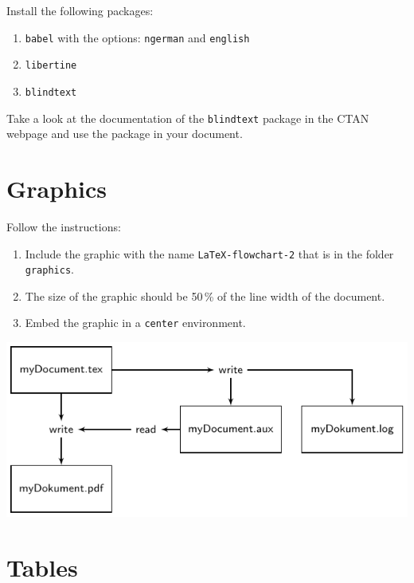 \documentclass[10pt, paper=a4, abstracton]{scrartcl}
\begin{document}
Install the following packages:

\begin{enumerate}
	\item \texttt{babel} with the options: \texttt{ngerman} and \texttt{english}
	
	\item \texttt{libertine}
	
	\item \texttt{blindtext}

\end{enumerate}

Take a look at the documentation of the \texttt{blindtext} package in the CTAN webpage and use the package in your document.


\blindtext


\section{Graphics}

Follow the instructions:

\begin{enumerate}
	\item Include the graphic with the name \texttt{LaTeX-flowchart-2} that is in the folder \texttt{graphics}. 
	
	\item The size of the graphic should be 50\,\% of the line width of the document.
	
	\item Embed the graphic in a \texttt{center} environment.
\end{enumerate}

\begin{center}
\includegraphics[width=.5\linewidth]{graphics/LaTeX-flowchart-2}
\end{center}


\section{Tables}
\end{document}
